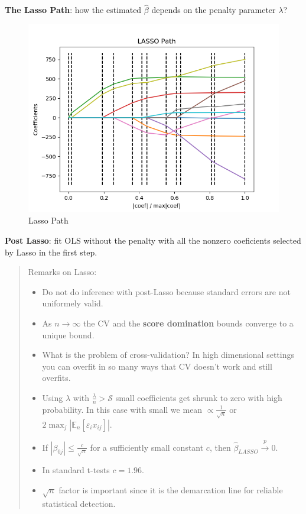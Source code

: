 \documentclass[12pt,]{book}
\providecommand{\tightlist}{%
  \setlength{\itemsep}{0pt}\setlength{\parskip}{0pt}}
\begin{document}
\textbf{The Lasso Path}: how the estimated \(\hat{\beta}\) depends on the penalty parameter \(\lambda\)?

\begin{figure}
\centering
\includegraphics{figures/Fig_642.png}
\caption{Lasso Path}
\end{figure}

\textbf{Post Lasso}: fit OLS without the penalty with all the nonzero coeficients selected by Lasso in the first step.

\begin{quote}
Remarks on Lasso:

\begin{itemize}
\tightlist
\item
  Do not do inference with post-Lasso because standard errors are not uniformely valid.
\item
  As \(n \to \infty\) the CV and the \textbf{score domination} bounds converge to a unique bound.
\item
  What is the problem of cross-validation? In high dimensional settings you can overfit in so many ways that CV doesn't work and still overfits.
\item
  Using \(\lambda\) with \(\frac{\lambda}{n} > \mathcal{S}\) small coefficients get shrunk to zero with high probability. In this case with small we mean \(\propto \frac{1}{\sqrt{n}}\) or \(2 \max_j | \mathbb E_n[\varepsilon_i x_{ij}] |\).
\item
  If \(| \beta_{0j}| \leq \frac{c}{\sqrt{n}}\) for a sufficiently small constant \(c\), then \(\hat{\beta}_{LASSO} \overset{p}{\to} 0\).
\item
  In standard t-tests \(c = 1.96\).
\item
  \(\sqrt{n}\) factor is important since it is the demarcation line for reliable statistical detection.
\end{itemize}
\end{quote}
\end{document}
